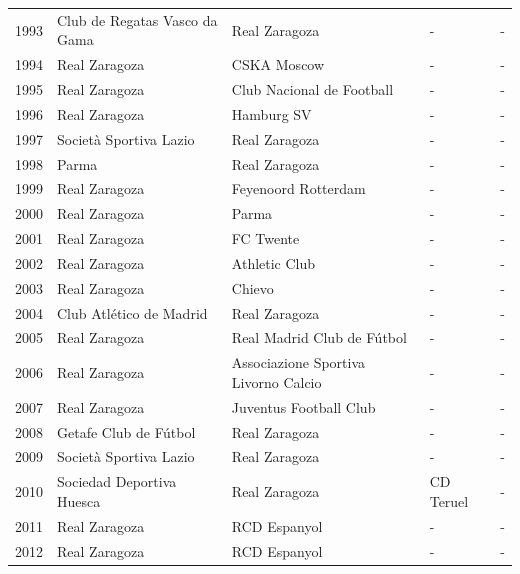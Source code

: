 \documentclass{article}
\begin{document}
\begin{tabular}{lllll}
1993 & Club de Regatas Vasco da Gama & Real Zaragoza & - & - \\
1994 & Real Zaragoza & CSKA Moscow & - & - \\
1995 & Real Zaragoza & Club Nacional de Football & - & - \\
1996 & Real Zaragoza & Hamburg SV & - & - \\
1997 & Società Sportiva Lazio & Real Zaragoza & - & - \\
1998 & Parma & Real Zaragoza & - & - \\
1999 & Real Zaragoza & Feyenoord Rotterdam & - & - \\
2000 & Real Zaragoza & Parma & - & - \\
2001 & Real Zaragoza & FC Twente & - & - \\
2002 & Real Zaragoza & Athletic Club & - & - \\
2003 & Real Zaragoza & Chievo & - & - \\
2004 & Club Atlético de Madrid & Real Zaragoza & - & - \\
2005 & Real Zaragoza & Real Madrid Club de Fútbol & - & - \\
2006 & Real Zaragoza & Associazione Sportiva Livorno Calcio & - & - \\
2007 & Real Zaragoza & Juventus Football Club & - & - \\
2008 & Getafe Club de Fútbol & Real Zaragoza & - & - \\
2009 & Società Sportiva Lazio & Real Zaragoza & - & - \\
2010 & Sociedad Deportiva Huesca & Real Zaragoza & CD Teruel & - \\
2011 & Real Zaragoza & RCD Espanyol & - & - \\
2012 & Real Zaragoza & RCD Espanyol & - & - \\
\bottomrule
\end{tabular}
\end{document}
